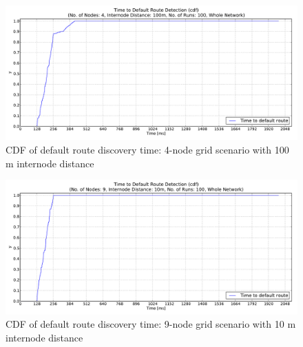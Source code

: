 \begin{figure}[htb]
  \begin{center}
  \vspace{-20pt}
    \leavevmode
      \includegraphics[scale=0.38]
      {Pics/results/4/MRHOF/grid/dist100_montecarlo_cdf_hist.pdf}
   \caption{CDF of default route discovery time: 4-node grid scenario with 100 m internode distance}
   \label{fig:4_MRHOF_grid_100_cdf}
  \end{center}
\end{figure}

\begin{figure}[htpb]
  \begin{center}
   \vspace{-20pt}
    \leavevmode
      \includegraphics[scale=0.38]
      {Pics/results/9/MRHOF/grid/dist10_montecarlo_cdf_hist.pdf}
   \caption{CDF of default route discovery time: 9-node grid scenario with 10 m internode distance}
   \label{fig:9_MRHOF_grid_10_cdf}
  \end{center}
\end{figure}

